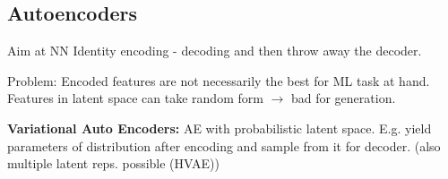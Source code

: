 \subsection{Autoencoders}

Aim at NN Identity encoding - decoding and then throw away the decoder.

Problem: Encoded features are not necessarily the best for ML task at hand. Features in latent space can take random form $\rightarrow$ bad for generation.

\textbf{Variational Auto Encoders:} AE with probabilistic latent space. E.g. yield parameters of distribution after encoding and sample from it for decoder. (also multiple latent reps. possible (HVAE))
